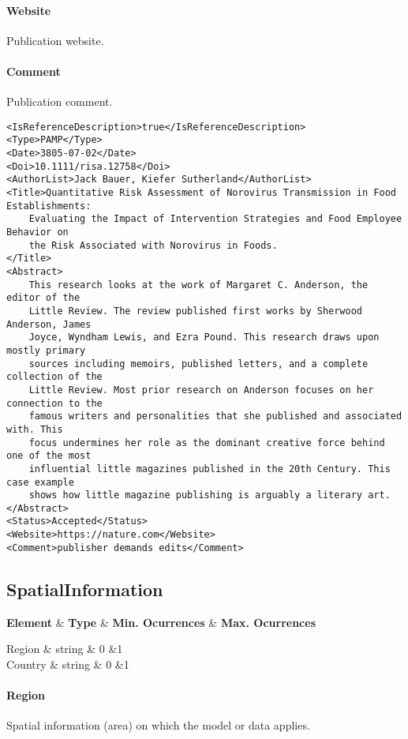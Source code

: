 \documentclass[a4paper]{report}
\def\starttable{%
    \tabular{|l|c|c|c|}
    \hline
    \textbf{Element} & \textbf{Type} & \textbf{Min. Ocurrences} & \textbf{Max. Ocurrences} \\    
    \hline
}
\def\R #1|#2|#3|#4{ #1&#2&#3&#4 \\}
\def\stoptable{%
    \hline \endtabular
}
\begin{document}
\paragraph{Website}
Publication website.

\paragraph{Comment}
Publication comment.

\begin{lstlisting}[language=RAKIP, caption={Example of Reference}]
<IsReferenceDescription>true</IsReferenceDescription>
<Type>PAMP</Type>
<Date>3805-07-02</Date>
<Doi>10.1111/risa.12758</Doi>
<AuthorList>Jack Bauer, Kiefer Sutherland</AuthorList>
<Title>Quantitative Risk Assessment of Norovirus Transmission in Food Establishments:
    Evaluating the Impact of Intervention Strategies and Food Employee Behavior on
    the Risk Associated with Norovirus in Foods.
</Title>
<Abstract>
    This research looks at the work of Margaret C. Anderson, the editor of the
    Little Review. The review published first works by Sherwood Anderson, James
    Joyce, Wyndham Lewis, and Ezra Pound. This research draws upon mostly primary
    sources including memoirs, published letters, and a complete collection of the
    Little Review. Most prior research on Anderson focuses on her connection to the
    famous writers and personalities that she published and associated with. This
    focus undermines her role as the dominant creative force behind one of the most
    influential little magazines published in the 20th Century. This case example
    shows how little magazine publishing is arguably a literary art.
</Abstract>
<Status>Accepted</Status>
<Website>https://nature.com</Website>
<Comment>publisher demands edits</Comment>
\end{lstlisting}

\subsection{SpatialInformation}
\label{class:SpatialInformation}

\starttable
    \R Region | string | 0 | 1
    \R Country | string | 0 | 1
\stoptable

\paragraph{Region}
Spatial information (area) on which the model or data applies.
\end{document}
